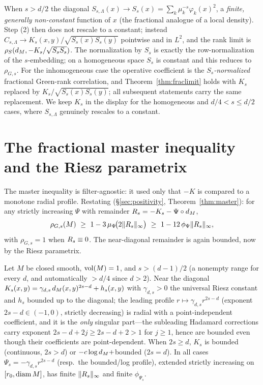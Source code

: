 \begin{remark}
When $s>d/2$ the diagonal $S_{s,\Lambda}(x)\to S_s(x)=\sum_k\mu_k^{-s}\varphi_k(x)^2$, a
\emph{finite, generally non-constant} function of $x$ (the fractional analogue of a local
density). Step (2) then does not rescale to a constant; instead $C_{s,\Lambda}\to
K_s(x,y)/\sqrt{S_s(x)S_s(y)}$ pointwise and in $L^2$, and the rank limit is
$\rho_S(d_M,-K_s/\sqrt{S_sS_s})$. The normalization by $S_s$ is exactly the row-normalization
of the $s$-embedding; on a homogeneous space $S_s$ is constant and this reduces to
$\rho_{G,s}$. For the inhomogeneous case the operative coefficient is the
\emph{$S_s$-normalized} fractional Green-rank correlation, and Theorem~\ref{thm:fraclimit}
holds with $K_s$ replaced by $K_s/\sqrt{S_s(x)S_s(y)}$; all subsequent statements carry the
same replacement. We keep $K_s$ in the display for the homogeneous and $d/4<s\le d/2$ cases,
where $S_{s,\Lambda}$ genuinely rescales to a constant.
\end{remark}

\section{The fractional master inequality and the Riesz parametrix}

The master inequality is filter-agnostic: it used only that $-K$ is compared to a monotone
radial profile. Restating (\S\ref{sec:positivity}, Theorem~\ref{thm:master}): for any strictly increasing $\Psi$ with remainder
$R_s=-K_s-\Psi\circ d_M$,
\[
\rho_{G,s}(M)\ \ge\ 1-3\,\mu_\Psi\!\bigl(2\lVert\Rem_s\rVert_\infty\bigr)\ \ge\
1-12\,\phi_\Psi\lVert\Rem_s\rVert_\infty,
\]
with $\rho_{G,s}=1$ when $R_s\equiv0$. The near-diagonal remainder is again bounded, now
by the Riesz parametrix.

\begin{lemma}\label{lem:riesz}
Let $M$ be closed smooth, $\operatorname{vol}(M)=1$, and $s>(d-1)/2$ (a nonempty range for every $d$, and
automatically $>d/4$ since $d>2$). Near the diagonal
$K_s(x,y)=\gamma_{d,s}\,d_M(x,y)^{2s-d}+h_s(x,y)$ with $\gamma_{d,s}>0$ the universal Riesz
constant and $h_s$ bounded up to the diagonal; the leading profile
$r\mapsto\gamma_{d,s}r^{2s-d}$ (exponent $2s-d\in(-1,0)$, strictly decreasing) is radial with a
point-independent coefficient, and it is the \emph{only} singular part---the subleading
Hadamard corrections carry exponent $2s-d+2j\ge2s-d+2>1$ for $j\ge1$, hence are bounded even
though their coefficients are point-dependent. When $2s\ge d$, $K_s$ is bounded (continuous,
$2s>d$) or $-c\log d_M+$bounded ($2s=d$). In all cases $\Psi_s=-\gamma_{d,s}r^{2s-d}$ (resp.\
the bounded/log profile), extended strictly increasing on $[r_0,\operatorname{diam} M]$, has finite
$\lVert R_{s}\rVert_\infty$ and finite $\phi_{\Psi_s}$.
\end{lemma}

